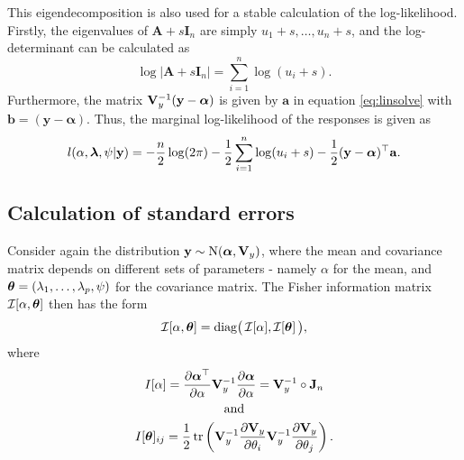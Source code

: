 This eigendecomposition is also used for a stable calculation of the log-likelihood. Firstly, the eigenvalues of $\mathbf A + s\mathbf I_n$ are simply $u_1 \!+\! s, \dots, u_n \!+\! s$, and the log-determinant can be calculated as
\[
	\log |\mathbf A + s\mathbf I_n| = \sum_{i=1}^n \log (u_i + s).
\]
Furthermore, the matrix $\mathbf{V}_y^{-1}(\mathbf y - \boldsymbol\alpha)$ is given by $\mathbf a$ in equation \eqref{eq:linsolve} with $\mathbf b = (\mathbf y - \boldsymbol\alpha)$. Thus, the marginal log-likelihood of the responses is given as
\[
	l(\alpha, \boldsymbol{\lambda}, \psi|\mathbf y) = -\frac{n}{2}\log(2\pi) - \frac{1}{2}\sum_{i=1}^n \log (u_i + s) - \frac{1}{2}(\mathbf y - \boldsymbol\alpha)^\top \mathbf a.
\]

\subsection{Calculation of standard errors}

Consider again the distribution ${\mathbf y} \sim \operatorname{N} ({\bm\alpha}, {\mathbf V}_y)$, where the mean and covariance matrix depends on different sets of parameters - namely $\alpha$ for the mean, and ${\bm\theta}=(\lambda_1,\dots,\lambda_p,\psi)$ for the covariance matrix. The Fisher information matrix ${\mathcal I}[\alpha, {\bm\theta}]$ then has the form
\[
	{\mathcal I}[\alpha, {\bm\theta}] = \text{diag} \big(\, {\mathcal I}[\alpha], {\mathcal I}[{\bm\theta}] \, \big),
\]
where
\begin{align*}
	\begin{gathered}
		I[\alpha] = \frac{\partial\boldsymbol{\alpha}^\top}{\partial\alpha} \mathbf V_y^{-1} \frac{\partial\boldsymbol{\alpha}}{\partial\alpha} = \mathbf V_y^{-1} \circ \mathbf J_n \\
		\text{and} \\
		I[\boldsymbol{\theta}]_{ij} = \frac{1}{2}\operatorname{tr}\left(\mathbf V_y^{-1}\frac{\partial\mathbf V_y}{\partial\theta_i}\mathbf V_y^{-1}\frac{\partial\mathbf V_y}{\partial\theta_j} \right).
	\end{gathered}
\end{align*}


